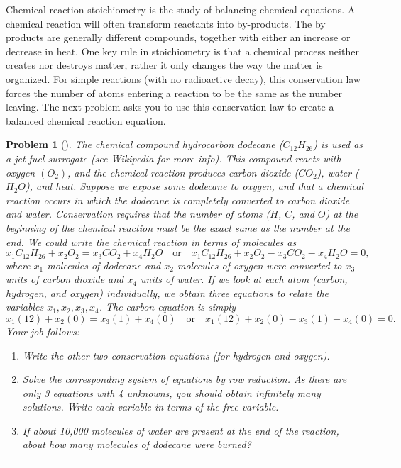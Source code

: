 \documentclass[letterpaper,oneside]{book}%
\theoremstyle{plain}
\theoremstyle{box}
\theoremstyle{problem}
\newtheorem{problemnum}{Problem}[chapter]
\newenvironment{problem}[1][]{\begin{problemnum}[#1]}{\end{problemnum}\nopagebreak\hrule\bigskip}
\begin{document}
Chemical reaction stoichiometry is the study of balancing chemical equations. A chemical reaction will often transform reactants into by-products. The by products are generally different compounds, together with either an increase or decrease in heat. One key rule in stoichiometry is that a chemical process neither creates nor destroys matter, rather it only changes the way the matter is organized. For simple reactions (with no radioactive decay), this conservation law forces the number of atoms entering a reaction to be the same as the number leaving. The next problem asks you to use this conservation law to create a balanced chemical reaction equation. 
\begin{problem}
 The chemical compound hydrocarbon dodecane ($C_{12}H_{26}$) is used as a jet fuel surrogate (see Wikipedia for more info).  This compound reacts with oxygen $(O_2)$, and the chemical reaction produces carbon dioxide ($CO_2$), water ($H_2 O$), and heat.  Suppose we expose some dodecane to oxygen, and that a chemical reaction occurs in which the dodecane is completely converted to carbon dioxide and water.  
 Conservation requires that the number of atoms ($H$, $C$, and $O$) at the beginning of the chemical reaction must be the exact same as the number at the end. 
 We could write the chemical reaction in terms of molecules as
 $$x_1 C_{12}H_{26} +x_2 O_2 = x_3 CO_2+ x_4 H_2O\quad \text{or} \quad x_1 C_{12}H_{26} +x_2 O_2 - x_3 CO_2- x_4 H_2O=0, $$
 where $x_1$ molecules of dodecane and $x_2$ molecules of oxygen were converted to $x_3$ units of carbon dioxide and $x_4$ units of water.  
 If we look at each atom (carbon, hydrogen, and oxygen) individually, we obtain three equations to relate the variables $x_1, x_2, x_3, x_4$.  The carbon equation is simply
 $$x_1(12) + x_2(0) = x_3(1)+x_4(0) \quad \text{or}\quad x_1(12) + x_2(0) - x_3(1)-x_4(0)=0.$$  
 Your job follows:
\begin{enumerate}
 \item Write the other two conservation equations (for hydrogen and oxygen). 
 \item Solve the corresponding system of equations by row reduction.  As there are only 3 equations with 4 unknowns, you should obtain infinitely many solutions. Write each variable in terms of the free variable.  
 \item If about 10,000 molecules of water are present at the end of the reaction, about how many molecules of dodecane were burned? 
\end{enumerate}
\end{problem}
\end{document}
